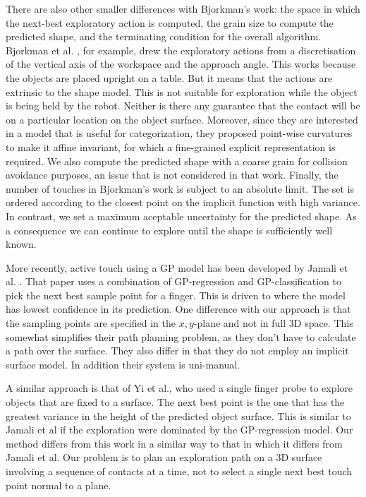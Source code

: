 There are also other smaller differences with Bjorkman's work: the space in which the next-best exploratory action is computed, the grain size to compute the predicted shape, and the terminating condition for the overall algorithm.
Bjorkman et al.
\cite{Bjorkman2013Enhancing}, for example,
drew the exploratory actions from a discretisation of the vertical axis of the workspace and the approach angle. This works because the objects are placed upright on a table. But it means that the actions are extrinsic to the shape model. This is not suitable for exploration while the object is being held by the robot. Neither is there any guarantee that the contact will be on a particular location on the object surface. Moreover, since they are interested in a model that is useful for categorization, they proposed point-wise curvatures to make it affine invariant, for which a fine-grained explicit representation is required. We also compute the predicted shape with a coarse grain for collision avoidance purposes, an issue that is not considered in that work. Finally, the number of touches in Bjorkman's work is subject to an absolute limit. The set is ordered according to the closest point on the implicit function with high variance. In contrast, we set a maximum aceptable uncertainty for the predicted shape. As a consequence we can continue to explore until the shape is sufficiently well known.

More recently, active touch using a GP model has been developed by Jamali et al. \cite{jamali2016}. That paper uses a combination of GP-regression and GP-classification to pick the next best sample point for a finger. This is driven to where the model has lowest confidence in its prediction. One difference with our approach is that the sampling points are specified in the $x,y$-plane and not in full 3D space. This somewhat simplifies their path planning problem, as they don't have to calculate a path over the surface. They also differ in that they do not employ an implicit surface model. In addition their system is uni-manual. 

A similar approach is that of Yi et al., who used a single finger probe to explore objects that are fixed to a surface. The next best point is the one that has the greatest variance in the height of the predicted object surface. This is similar to Jamali et al if the exploration were dominated by the GP-regression model. Our method differs from this work in a similar way to that in which it differs from Jamali et al. Our problem is to plan an exploration path on a 3D surface involving a sequence of contacts at a time, not to select a single next best touch point normal to a plane.

